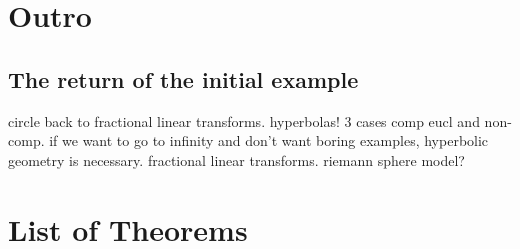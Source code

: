 \documentclass[
]{article}
\theoremstyle{break}
\theoremstyle{plain}
\begin{document}
\hypertarget{outro}{%
\section{Outro}\label{outro}}


\hypertarget{return-of-the-initial-example}{%
\subsection{The return of the initial example
}\label{return-of-the-initial-example}}

circle back to fractional linear transforms.
hyperbolas! 3 cases comp eucl and non-comp. if we want to go to infinity
and don't want boring examples, hyperbolic geometry is necessary.
fractional linear transforms. riemann sphere model?




\cleardoublepage

\section{List of Theorems}

{}
\listoffigures

{}
\printbibliography
\end{document}
